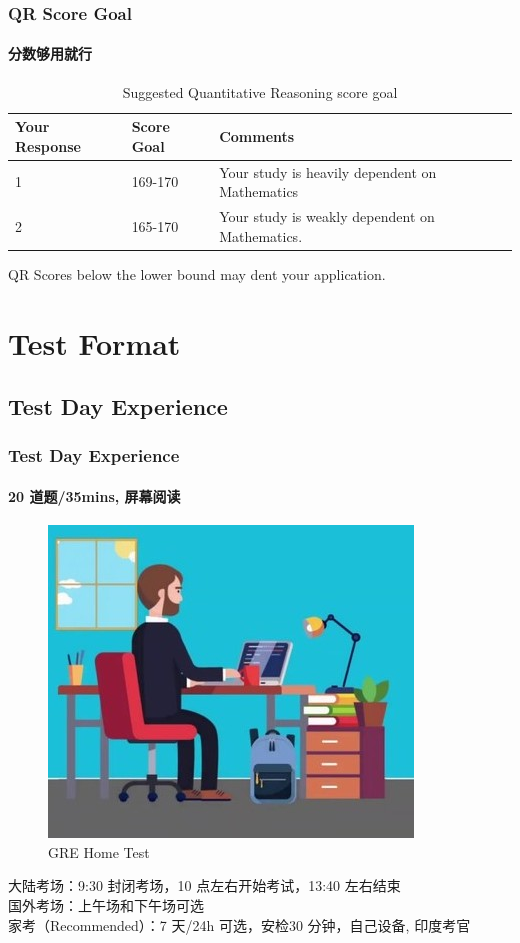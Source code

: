 \documentclass[
	11pt, %
]{beamer}
\begin{document}

\begin{frame}
	\frametitle{QR Score Goal}
	\framesubtitle{分数够用就行}
	\begin{table}
		\begin{tabular}{l l l}
			\toprule
			\textbf{Your Response} & \textbf{Score Goal} & \textbf{Comments}\\
			\midrule
			1 & 169-170 & Your study is heavily dependent on Mathematics \\
			2 & 165-170 & Your study is weakly dependent on Mathematics.\\
			\bottomrule
		\end{tabular}
		\caption{Suggested Quantitative Reasoning score goal}
	\end{table}
	\alert{QR Scores below the lower bound may dent your application.}
\end{frame}






\section{Test Format}

\subsection{Test Day Experience}
\begin{frame}
	\frametitle{Test Day Experience}
	\framesubtitle{20 道题/35mins, 屏幕阅读}
	
	\begin{figure}
		\includegraphics[width=0.4\linewidth]{GRE_Home_Test.jpeg}
		\caption{GRE Home Test}
	\end{figure}
	大陆考场：9:30 封闭考场，10 点左右开始考试，13:40 左右结束\\
	国外考场：上午场和下午场可选\\
	家考（Recommended）：7 天/24h 可选，安检30 分钟，自己设备, 印度考官\\
\end{frame}
\end{document}
